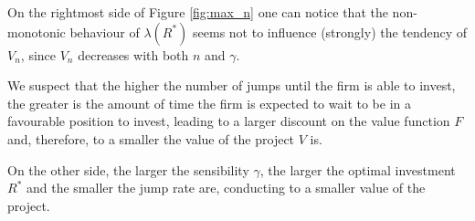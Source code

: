 On the rightmost side of Figure \ref{fig:max_n} one can notice that the non-monotonic behaviour of $\lambda(R^*)$ seems not to influence (strongly) the tendency of $V_n$, since $V_n$ decreases with both $n$ and $\gamma$.

We suspect that the higher the number of jumps until the firm is able to invest, the greater is the amount of time the firm is expected to wait to be in a favourable position to invest, leading to a larger discount on the value function $F$ and, therefore, to a smaller the value of the project $V$ is. 

On the other side, the larger the sensibility $\gamma$, the larger the optimal investment $R^*$ and the smaller the jump rate are, conducting to a smaller value of the project.


